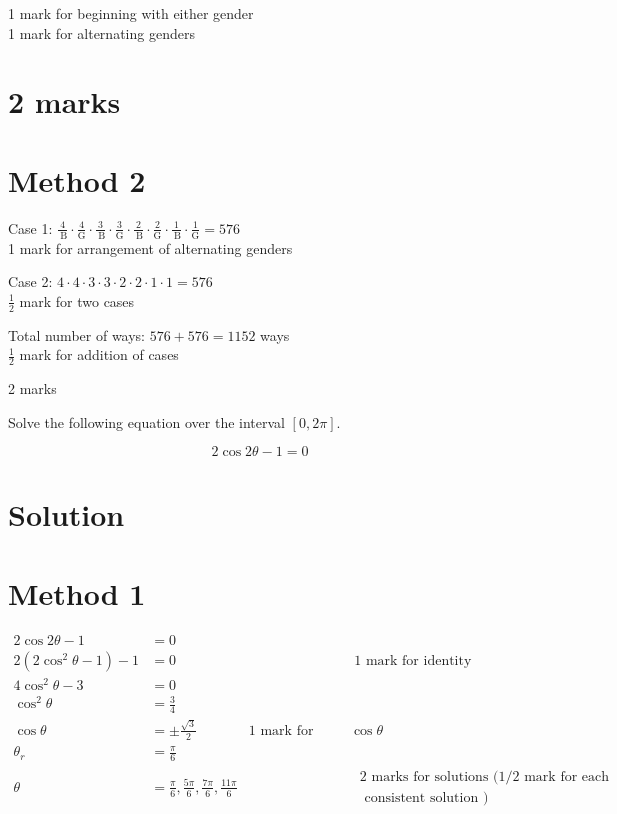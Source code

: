 \documentclass[10pt]{article}
\begin{document}
1 mark for beginning with either gender\\
1 mark for alternating genders

\section*{2 marks}
\section*{Method 2}
Case 1: $\frac{4}{\mathrm{~B}} \cdot \frac{4}{\mathrm{G}} \cdot \frac{3}{\mathrm{~B}} \cdot \frac{3}{\mathrm{G}} \cdot \frac{2}{\mathrm{~B}} \cdot \frac{2}{\mathrm{G}} \cdot \frac{1}{\mathrm{~B}} \cdot \frac{1}{\mathrm{G}}=576$\\
1 mark for arrangement of alternating genders

Case 2: $4 \cdot 4 \cdot 3 \cdot 3 \cdot 2 \cdot 2 \cdot 1 \cdot 1=576$\\
$\frac{1}{2}$ mark for two cases

Total number of ways: $576+576=1152$ ways\\
$\frac{1}{2}$ mark for addition of cases

2 marks

Solve the following equation over the interval $[0,2 \pi]$.

$$
2 \cos 2 \theta-1=0
$$

\section*{Solution}
\section*{Method 1}
$$
\begin{array}{rlrl}
2 \cos 2 \theta-1 & =0 & & \\
2\left(2 \cos ^{2} \theta-1\right)-1 & =0 & & 1 \text { mark for identity } \\
4 \cos ^{2} \theta-3 & =0 & & \\
\cos ^{2} \theta & =\frac{3}{4} & & \\
\cos \theta & = \pm \frac{\sqrt{3}}{2} & 1 \text { mark for solving for } \cos \theta \\
\theta_{r} & =\frac{\pi}{6} & & \\
\theta & =\frac{\pi}{6}, \frac{5 \pi}{6}, \frac{7 \pi}{6}, \frac{11 \pi}{6} & & \begin{array}{l}
2 \text { marks for solutions }(1 / 2 \text { mark for each } \\
\text { consistent solution })
\end{array}
\end{array}
$$
\end{document}
